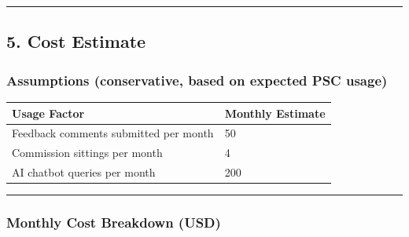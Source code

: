 \documentclass[
]{article}
\newcounter{none} %
\begin{document}
\begin{center}\rule{0.5\linewidth}{0.5pt}\end{center}

\subsection{5. Cost Estimate}\label{cost-estimate}

\subsubsection{Assumptions (conservative, based on expected PSC
usage)}\label{assumptions-conservative-based-on-expected-psc-usage}

{\def\LTcaptype{none} %
\begin{longtable}[]{@{}ll@{}}
\toprule\noalign{}
Usage Factor & Monthly Estimate \\
\midrule\noalign{}
\endhead
\bottomrule\noalign{}
\endlastfoot
Feedback comments submitted per month & 50 \\
Commission sittings per month & 4 \\
AI chatbot queries per month & 200 \\
\end{longtable}
}

\begin{center}\rule{0.5\linewidth}{0.5pt}\end{center}

\subsubsection{Monthly Cost Breakdown
(USD)}\label{monthly-cost-breakdown-usd}
\end{document}

